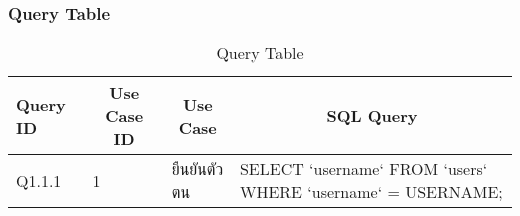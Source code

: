 
\begin{landscape}
\subsubsection{Query Table}

\begin{table}[]
\caption{Query Table}
\label{tab:query-table}
\begin{tabularx}{\textwidth}{|l|l|l|l|}
\hline
\multicolumn{1}{|X|}{\textbf{Query ID}} & \multicolumn{1}{c|}{\textbf{Use Case ID}} & \multicolumn{1}{c|}{\textbf{Use Case}} & \multicolumn{1}{c|}{\textbf{SQL Query}}                                                                                                                                                                                                                                                                                                                                                                                                                                                        \\ \hline
Q1.1.1                                  & 1                                         & ยืนยันตัวตน                            & SELECT `username` FROM `users` WHERE `username` = USERNAME;                                                                                                                                                                                                                                                                                                                                                                                                                                    \\ \hline

\end{tabularx}
\end{table}
\end{landscape}
